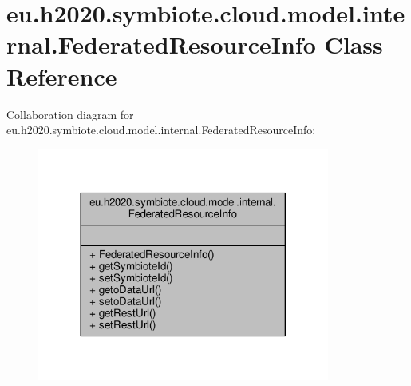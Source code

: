 \hypertarget{classeu_1_1h2020_1_1symbiote_1_1cloud_1_1model_1_1internal_1_1FederatedResourceInfo}{}\section{eu.\+h2020.\+symbiote.\+cloud.\+model.\+internal.\+Federated\+Resource\+Info Class Reference}
\label{classeu_1_1h2020_1_1symbiote_1_1cloud_1_1model_1_1internal_1_1FederatedResourceInfo}


Collaboration diagram for eu.\+h2020.\+symbiote.\+cloud.\+model.\+internal.\+Federated\+Resource\+Info\+:
\nopagebreak
\begin{figure}[H]
\begin{center}
\leavevmode
\includegraphics[width=272pt]{classeu_1_1h2020_1_1symbiote_1_1cloud_1_1model_1_1internal_1_1FederatedResourceInfo__coll__graph}
\end{center}
\end{figure}
